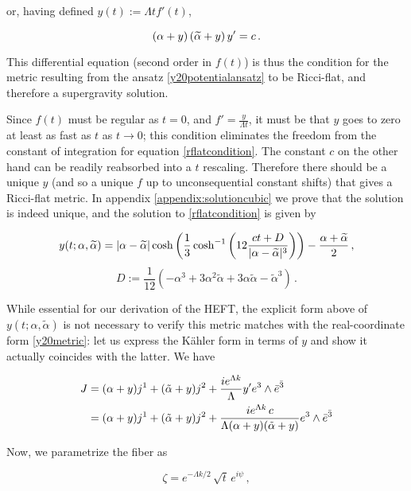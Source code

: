 or, having defined $y(t) := \Lambda t f'(t)$,

\begin{equation}
	(\alpha + y)\,(\widetilde{\alpha} + y)\, y' = c\,. \label{rflatcondition}
\end{equation}

This differential equation (second order in $f(t)$) is thus the condition for the metric resulting from the ansatz \eqref{y20potentialansatz} to be Ricci-flat, and therefore a supergravity solution.

Since $f(t)$ must be regular as $t=0$, and $f' = \frac{y}{\Lambda t}$, it must be that $y$ goes to zero at least as fast as $t$ as $t\rightarrow 0$; this condition eliminates the freedom from the constant of integration for equation \eqref{rflatcondition}. The constant $c$ on the other hand can be readily reabsorbed into a $t$ rescaling. Therefore there should be a unique $y$ (and so a unique $f$ up to unconsequential constant shifts) that gives a Ricci-flat metric. In appendix \ref{appendix:solutioncubic} we prove that the solution is indeed unique, and the solution to \eqref{rflatcondition} is given by


\begin{equation}
	y(t;\alpha,\widetilde{\alpha})  = |\alpha - \widetilde{\alpha}| \cosh \left( \frac{1}{3} \cosh^{-1} \left(  12 \frac{ct + D}{|\alpha-\widetilde{\alpha}|^3}  \right) \right)  - \frac{\alpha + \widetilde{\alpha}}{2}\,,
	\label{}
\end{equation}
\begin{equation}
	 D := \frac{1}{12}(-\alpha^3 + 3 \alpha^2 \tilde\alpha + 3 \alpha\tilde{\alpha} - \tilde{\alpha}^3) \,.
	\label{}
\end{equation}

While essential for our derivation of the HEFT, the explicit form above of $y(t;\alpha,\tilde\alpha)$ is not necessary to verify this metric matches with the real-coordinate form \eqref{y20metric}: let us express the K\"ahler form in terms of $y$ and show it actually coincides with the latter. We have

\begin{align}
	\label{Jintermsofy}
	J & =  (\alpha + y) j^1 + (\tilde{\alpha} + y) j^2 + \frac{ie^{\Lambda k}}\Lambda y' e^3 \wedge \bar e^{\bar 3}\\
	  & =  (\alpha + y) j^1 + (\tilde{\alpha} + y) j^2 + \frac{ie^{\Lambda k} \,c}{\Lambda (\alpha + y)(\tilde{\alpha} + y)} e^3 \wedge \bar e^{\bar 3}
\end{align}

Now, we parametrize the fiber as 

\begin{equation}
	\zeta = e^{-\Lambda k/2}\, \sqrt{t} \,e^{i\psi}\,,
\end{equation}

